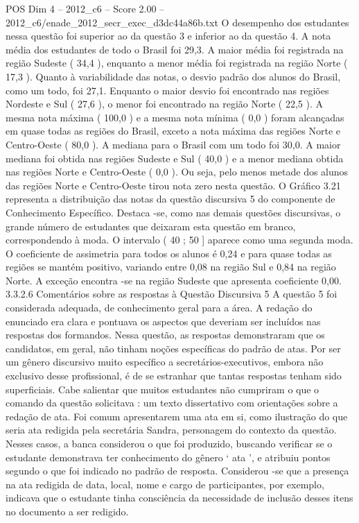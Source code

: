 \begin{textsample}{POS Dim 4 – 2012\_c6 – Score 2.00 – 2012\_c6/enade\_2012\_secr\_exec\_d3dc44a86b.txt}
O desempenho dos estudantes nessa questão foi superior ao da questão 3 e inferior ao da questão 4.
A nota média dos estudantes de todo o Brasil foi 29,3.
A maior média foi registrada na região Sudeste ( 34,4 ), enquanto a menor média foi registrada na região Norte ( 17,3 ).
Quanto à variabilidade das notas, o desvio padrão dos alunos do Brasil, como um todo, foi 27,1.
Enquanto o maior desvio foi encontrado nas regiões Nordeste e Sul ( 27,6 ), o menor foi encontrado na região Norte ( 22,5 ).
A mesma nota máxima ( 100,0 ) e a mesma nota mínima ( 0,0 ) foram alcançadas em quase todas as regiões do Brasil, exceto a nota máxima das regiões Norte e Centro-Oeste ( 80,0 ).
A mediana para o Brasil com um todo foi 30,0.
A maior mediana foi obtida nas regiões Sudeste e Sul ( 40,0 ) e a menor mediana obtida nas regiões Norte e Centro-Oeste ( 0,0 ).
Ou seja, pelo menos metade dos alunos das regiões Norte e Centro-Oeste tirou nota zero nesta questão.
O Gráfico 3.21 representa a distribuição das notas da questão discursiva 5 do componente de Conhecimento Específico.
Destaca -se, como nas demais questões discursivas, o grande número de estudantes que deixaram esta questão em branco, correspondendo à moda.
O intervalo ( 40 ; 50 ] aparece como uma segunda moda.
O coeficiente de assimetria para todos os alunos é 0,24 e para quase todas as regiões se mantém positivo, variando entre 0,08 na região Sul e 0,84 na região Norte.
A exceção encontra -se na região Sudeste que apresenta coeficiente 0,00. 3.3.2.6 Comentários sobre as respostas à Questão Discursiva 5 A questão 5 foi considerada adequada, de conhecimento geral para a área.
A redação do enunciado era clara e pontuava os aspectos que deveriam ser incluídos nas respostas dos formandos.
Nessa questão, as respostas demonstraram que os candidatos, em geral, não tinham noções específicas do padrão de atas.
Por ser um gênero discursivo muito específico a secretários-executivos, embora não exclusivo desse profissional, é de se estranhar que tantas respostas tenham sido superficiais.
Cabe salientar que muitos estudantes não cumpriram o que o comando da questão solicitava : um texto dissertativo com orientações sobre a redação de ata.
Foi comum apresentarem uma ata em si, como ilustração do que seria ata redigida pela secretária Sandra, personagem do contexto da questão.
Nesses casos, a banca considerou o que foi produzido, buscando verificar se o estudante demonstrava ter conhecimento do gênero ‘ ata ’, e atribuiu pontos segundo o que foi indicado no padrão de resposta.
Considerou -se que a presença na ata redigida de data, local, nome e cargo de participantes, por exemplo, indicava que o estudante tinha consciência da necessidade de inclusão desses itens no documento a ser redigido.

\end{textsample}
